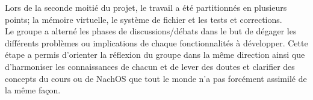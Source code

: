 \documentclass{report}
\begin{document}
Lors de la seconde moitié du projet, le travail a été partitionnés en plusieurs points; la mémoire virtuelle, le système de fichier et les tests et corrections.\\


Le groupe a alterné les phases de discussions/débats dans le but de dégager les différents problèmes ou implications de chaque fonctionnalités à développer. Cette étape a permis d'orienter la réflexion du groupe dans la même direction ainsi que d'harmoniser les connaissances de chacun et de lever des doutes et clarifier des concepts du cours ou de NachOS que tout le monde n'a pas forcément assimilé de la même façon.\\
\end{document}
